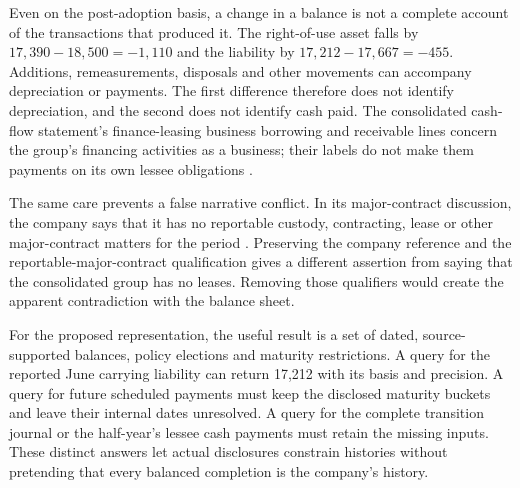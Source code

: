 Even on the post-adoption basis, a change in a balance is not a complete
account of the transactions that produced it. The right-of-use asset falls
by $17{,}390-18{,}500=-1{,}110$ and the liability by
$17{,}212-17{,}667=-455$. Additions, remeasurements, disposals and other
movements can accompany depreciation or payments. The first difference
therefore does not identify depreciation, and the second does not identify
cash paid. The consolidated cash-flow statement's finance-leasing business
borrowing and receivable lines concern the group's financing activities as
a business; their labels do not make them payments on its own lessee
obligations \citep[pp.\ 106--107]{pingan2019asbe}.

The same care prevents a false narrative conflict. In its major-contract
discussion, the company says that it has no reportable custody, contracting,
lease or other major-contract matters for the period
\citep[p.\ 86]{pingan2019asbe}. Preserving the company reference and
the reportable-major-contract qualification gives a different assertion
from saying that the consolidated group has no leases. Removing those
qualifiers would create the apparent contradiction with the balance sheet.

For the proposed representation, the useful result is a set of dated,
source-supported balances, policy elections and maturity restrictions.
A query for the reported June carrying liability can return 17,212 with
its basis and precision. A query for future scheduled payments must keep
the disclosed maturity buckets and leave their internal dates unresolved.
A query for the complete transition journal or the half-year's lessee cash
payments must retain the missing inputs. These distinct answers let actual
disclosures constrain histories without pretending that every balanced
completion is the company's history.

\clearpage

